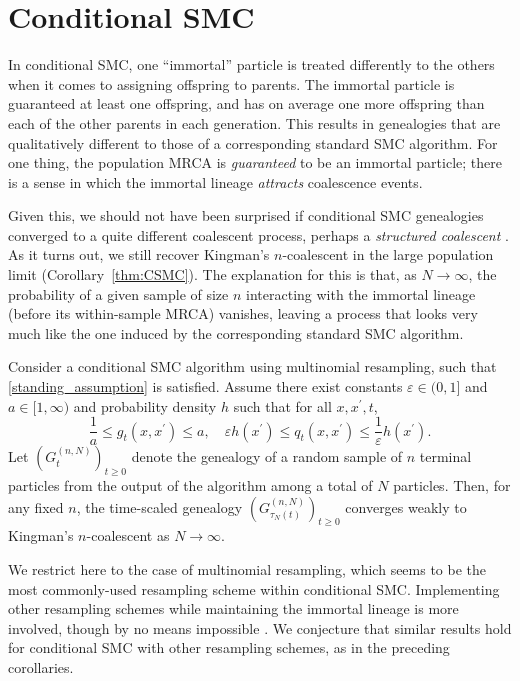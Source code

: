 \section{Conditional SMC}
In conditional SMC, one ``immortal'' particle is treated differently to the others when it comes to assigning offspring to parents. The immortal particle is guaranteed at least one offspring, and has on average one more offspring than each of the other parents in each generation.
This results in genealogies that are qualitatively different to those of a corresponding standard SMC algorithm. For one thing, the population MRCA is \emph{guaranteed} to be an immortal particle; there is a sense in which the immortal lineage \emph{attracts} coalescence events.

Given this, we should not have been surprised if conditional SMC genealogies converged to a quite different coalescent process, perhaps a \emph{structured coalescent} \parencite{notohara1990}.
As it turns out, we still recover Kingman's $n$-coalescent in the large population limit (Corollary~\ref{thm:CSMC}). 
The explanation for this is that, as $N\to\infty$, the probability of a given sample of size $n$ interacting with the immortal lineage (before its within-sample MRCA) vanishes, leaving a process that looks very much like the one induced by the corresponding standard SMC algorithm.

\begin{corollary}\label{thm:CSMC}
Consider a conditional SMC algorithm using multinomial resampling, such that \ref{standing_assumption} is satisfied. Assume there exist constants $\varepsilon\in (0,1]$ and $a\in [1,\infty)$ and probability density $h$ such that for all $x, x^\prime, t$,
\begin{equation}\label{eq:gq_bounds_csmc}
\frac{1}{a} \leq g_t(x, x^\prime) \leq a , \quad
\varepsilon h(x^\prime) \leq q_t(x, x^\prime) \leq \frac{1}{\varepsilon} h(x^\prime) .
\end{equation}
Let $(G_t^{(n,N)})_{t\geq0}$ denote the genealogy of a random sample of $n$ terminal particles from the output of the algorithm among a total of $N$ particles. Then, for any fixed $n$, the time-scaled genealogy $(G_{\tau_N(t)}^{(n,N)})_{t\geq0}$ converges weakly to Kingman's $n$-coalescent as $N\to \infty$.%
\end{corollary}
We restrict here to the case of multinomial resampling, which seems to be the most commonly-used resampling scheme within conditional SMC. Implementing other resampling schemes while maintaining the immortal lineage is more involved, though by no means impossible \parencite[for details see][for example]{lee2019}.
We conjecture that similar results hold for conditional SMC with other resampling schemes, as in the preceding corollaries.

